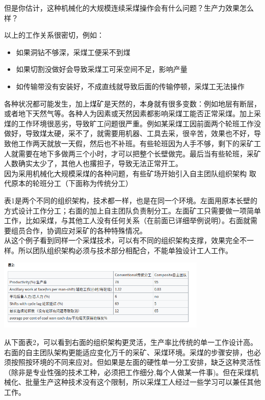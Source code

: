 但是你估计，这种机械化的大规模连续采煤操作会有什么问题？生产力效果怎么样？

以上的工作关系很密切，例如：

\begin{itemize}
\tightlist
\item
  如果洞钻不够深，采煤工便采不到煤
\item
  如果切割没做好会导致采煤工可采空间不足，影响产量
\item
  如传输带没有安装好，不成直线就导致后面的传输停顿，采煤工无法操作
\end{itemize}

各种状况都可能发生，加上煤矿是天然的，本身就有很多变数：例如地层有断层，或者地下天然气等。各种人为因素或天然因素都影响采煤工能否正常采煤。加上采煤的工作环境很恶劣，导致旷工问题很严重。例如某采煤工因前面两个轮班工作没做好，导致煤太硬，采不了，就需要用机器、工具去采，很辛苦，效果也不好，导致他工作两天就放一天假，然后也不补班。有些轮班因为人手不够，剩下的采矿工人就需要在地下多做两三个小时，才可以把整个长壁做完。最后当有些轮班，采矿人数确实太少了，其他人也撂担子，导致无法正常开工。\\
因为采用机械化大规模采煤的各种问题，有些矿场开始引入自主团队组织架构
取代原本的轮班分工（下面称为传统分工）

表1是两个不同的组织架构，技术都一样，也是在同一个环境。左面用原本长壁的方式设计工作分工；右面的加上自主团队负责制分工。左面矿工只需要做一项简单工作，比如采煤，与其他工人没有任何关系（在前面已详细举例说明）。右面就需要组员合作，协调应对采矿的各种特殊情况。\\
从这个例子看到同样一个采煤技术，可以有不同的组织架构支撑，效果完全不一样。所以团队组织架构必须与技术部分相配合，不能单独设计工人工作。


\includegraphics[width=10cm]{Screenshotfrom2022-12-2806-57-58.png}

从下面表2，可以看到右面的组织架构更灵活，生产率比传统的单一工作设计高。右面的自主团队架构更能适应变化万千的采矿、采煤环境。采煤的步骤安排，也必须按照按环境的不同来应对。但如果是左面的硬性单一分工安排，缺乏这种灵活性（除非是专业性强的技术工种，必须把工作细分,每个人做某一件事)。但在采煤机械化、批量生产这种技术没有这个限制，所以采煤工人经过一些学习可以兼任其他工作。

